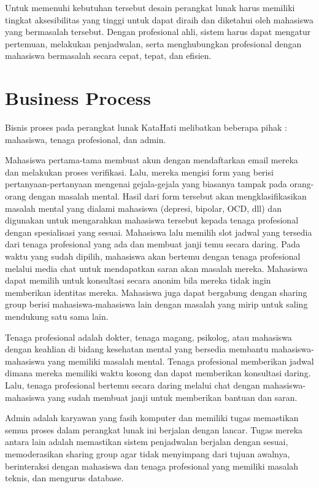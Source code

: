 \documentclass{article}
\begin{document}
	\par Untuk memenuhi kebutuhan tersebut desain perangkat lunak harus memiliki tingkat aksesibilitas yang tinggi untuk dapat diraih dan diketahui oleh mahasiswa yang bermasalah tersebut. Dengan profesional ahli, sistem harus dapat mengatur pertemuan, melakukan penjadwalan, serta menghubungkan profesional dengan mahasiswa bermasalah secara cepat, tepat, dan efisien. 


	\section{Business Process}
	\par Bisnis proses pada perangkat lunak KataHati melibatkan beberapa pihak : mahasiswa, tenaga profesional, dan admin. 
	\par Mahasiswa pertama-tama membuat akun dengan mendaftarkan email mereka dan melakukan proses verifikasi. Lalu, mereka mengisi form yang berisi pertanyaan-pertanyaan mengenai gejala-gejala yang biasanya tampak pada orang-orang dengan masalah mental. Hasil dari form tersebut akan mengklasifikasikan masalah mental yang dialami mahasiswa (depresi, bipolar, OCD, dll) dan digunakan untuk mengarahkan mahasiswa tersebut kepada tenaga profesional dengan spesialisasi yang sesuai. Mahasiswa lalu memilih slot jadwal yang tersedia dari tenaga profesional yang ada dan membuat janji temu secara daring. Pada waktu yang sudah dipilih, mahasiswa akan bertemu dengan tenaga profesional melalui media chat untuk mendapatkan saran akan masalah mereka. Mahasiswa dapat memilih untuk konsultasi secara anonim bila mereka tidak ingin memberikan identitas mereka. Mahasiswa juga dapat bergabung dengan sharing group berisi mahasiswa-mahasiswa lain dengan masalah yang mirip untuk saling mendukung satu sama lain. 
	\par Tenaga profesional adalah dokter, tenaga magang, psikolog, atau mahasiswa dengan keahlian di bidang kesehatan mental yang bersedia membantu mahasiswa-mahasiswa yang memiliki masalah mental. Tenaga profesional memberikan jadwal dimana mereka memiliki waktu kosong dan dapat memberikan konsultasi daring. Lalu, tenaga profesional bertemu secara daring melalui chat dengan mahasiswa-mahasiswa yang sudah membuat janji untuk memberikan bantuan dan saran. 
	\par Admin adalah karyawan yang fasih komputer dan memiliki tugas memastikan semua proses dalam perangkat lunak ini berjalan dengan lancar. Tugas mereka antara lain adalah memastikan sistem penjadwalan berjalan dengan sesuai, memoderasikan sharing group agar tidak menyimpang dari tujuan awalnya, berinteraksi dengan mahasiswa dan tenaga profesional yang memiliki masalah teknis, dan mengurus database. 
\end{document}
